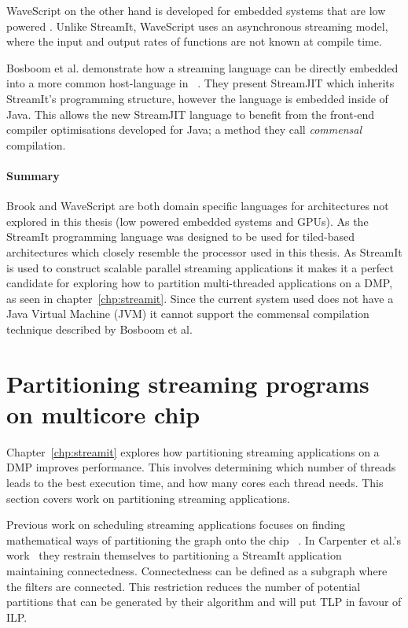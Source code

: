 WaveScript on the other hand is developed for embedded systems that are low powered \cite{newton2008wavescript}.
Unlike StreamIt, WaveScript uses an asynchronous streaming model, where the input and output rates of functions are not known at compile time.

Bosboom et al. demonstrate how a streaming language can be directly embedded into a more common host-language in ~\cite{bosboom2014streamjit}.
They present StreamJIT which inherits StreamIt's programming structure, however the language is embedded inside of Java.
This allows the new StreamJIT language to benefit from the front-end compiler optimisations developed for Java; a method they call \textit{commensal} compilation.
\vspace{-1em}
\paragraph*{Summary}
Brook and WaveScript are both domain specific languages for architectures not explored in this thesis (low powered embedded systems and GPUs).
As the StreamIt programming language was designed to be used for tiled-based architectures which closely resemble the processor used in this thesis.
As StreamIt is used to construct scalable parallel streaming applications it makes it a perfect candidate for exploring how to partition multi-threaded applications on a DMP, as seen in chapter~\ref{chp:streamit}.
Since the current system used does not have a Java Virtual Machine (JVM) it cannot support the commensal compilation technique described by Bosboom et al.


\section{Partitioning streaming programs on multicore chip}
Chapter~\ref{chp:streamit} explores how partitioning streaming applications on a DMP improves performance.
This involves determining which number of threads leads to the best execution time, and how many cores each thread needs.
This section covers work on partitioning streaming applications. 

Previous work on scheduling streaming applications focuses on finding mathematical ways of partitioning the graph onto the chip ~\cite{carpenter2009streammap,kudlur2008orchestratingstreamprog}.  
In Carpenter et al.'s work~\cite{carpenter2009streammap} they restrain themselves to partitioning a StreamIt application maintaining connectedness.
Connectedness can be defined as a subgraph where the filters are connected. 
This restriction reduces the number of potential partitions that can be generated by their algorithm and will put TLP in favour of ILP. 

